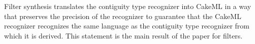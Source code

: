 Filter synthesis translates the contiguity type recognizer into CakeML in a way that preserves the precision of the recognizer to guarantee that the CakeML recognizer recognizes the same language as the contiguity type recognizer from which it is derived. This statement is the main result of the paper for filters.
